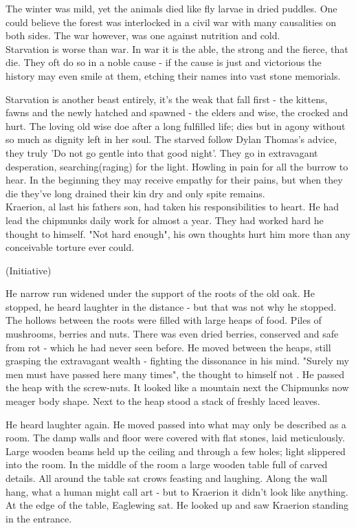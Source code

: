 \documentclass[smalldemyvopaper,11pt,twoside,onecolumn,openright,extrafontsizes]{memoir}
\begin{document}
The winter was mild, yet the animals died like fly larvae in dried puddles. One could believe the forest was interlocked in a civil war with many causalities on both sides. The war however, was one against nutrition and cold. \\

Starvation is worse than war. In war it is the able, the strong and the fierce, that die. They oft do so in a noble cause - if the cause is just and victorious the history may even smile at them, etching their names into vast stone memorials. 

Starvation is another beast entirely, it's the weak that fall first - the kittens, fawns and the newly hatched and spawned - the elders and wise, the crocked and hurt. The loving old wise doe after a long fulfilled life; dies but in agony without so much as dignity left in her soul. The starved follow Dylan Thomas's advice, they truly 'Do not go gentle into that good night'. They go in extravagant desperation, searching(raging) for the light. Howling in pain for all the burrow to hear. In the beginning they may receive empathy for their pains, but when they die they've long drained their kin dry and only spite remains.\\

Kraerion, al last his fathers son, had taken his responsibilities to heart. He had lead the chipmunks daily work for almost a year. They had worked hard he thought to himself. "Not hard enough", his own thoughts hurt him more than any conceivable torture ever could. 

(Initiative)


He narrow run widened under the support of the roots of the old oak. He stopped, he heard laughter in the distance - but that was not why he stopped. The hollows between the roots were filled with large heaps of food. Piles of mushrooms, berries and nuts. There was even dried berries, conserved and safe from rot - which he had never seen before. He moved between the heaps, still grasping the extravagant wealth - fighting the dissonance in his mind. "Surely my men must have passed here many times", the thought to himself not . He passed the heap with the screw-nuts. It looked like a mountain next the Chipmunks now meager body shape. Next to the heap stood a stack of freshly laced leaves. 

He heard laughter again. He moved passed into what may only be described as a room. The damp walls and floor were covered with flat stones, laid meticulously. Large wooden beams held up the ceiling and through a few holes; light slippered into the room. In the middle of the room a large wooden table full of carved details. All around the table sat crows feasting and laughing. Along the wall hang, what a human might call art - but to Kraerion it didn't look like anything. At the edge of the table, Eaglewing sat. He looked up and saw Kraerion standing in the entrance.\\
\end{document}
